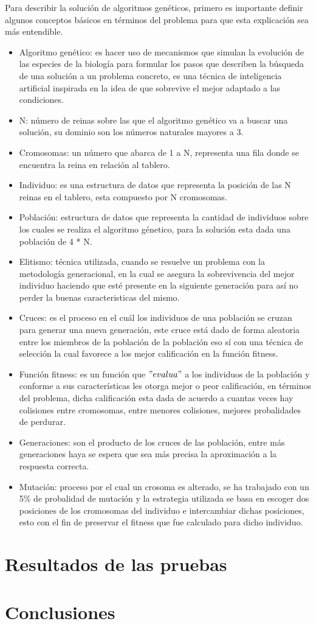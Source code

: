 \documentclass[12pt,a4paper]{article}
\begin{document}
\begin{enumerate}
Para describir la solución de algoritmos genéticos, primero es importante definir algunos conceptos básicos en términos del problema para que esta explicación sea más entendible. 
\begin{itemize}
\item Algoritmo genético: es hacer uso de mecanismos que simulan la evolución de las especies de la biología para formular los pasos que describen la búsqueda de una solución a un problema concreto, es una técnica de inteligencia artificial inspirada en la idea de que sobrevive el mejor adaptado a las condiciones.
\item N: número de reinas sobre las que el algoritmo genético va a buscar una solución, su dominio son los números naturales mayores a 3.
\item Cromosomas: un número que abarca de 1 a N, representa una fila donde se encuentra la reina en relación al tablero.
\item Individuo: es una estructura de datos que representa la posición de las N reinas en el tablero, esta compuesto por N cromosomas.
\item Población: estructura de datos que representa la cantidad de individuos sobre los cuales se realiza el algoritmo génetico, para la solución esta dada una población de 4 * N.
\item Elitismo: técnica utilizada, cuando se resuelve un problema con la metodología generacional, en la cual se asegura la sobrevivencia del mejor individuo haciendo que esté presente en la siguiente generación para así no perder la buenas caracteristicas del mismo. 
\item Cruces: es el proceso en el cuál los individuos de una población se cruzan para generar una nueva generación, este cruce está dado de forma aleatoria entre los miembros de la población de la población eso sí con una técnica de selección la cual favorece a los mejor calificación en la función fitness.
\item Función fitness: es un función que $"evalua"$ a los individuos de la población y conforme a sus características les otorga mejor o peor calificación, en términos del problema, dicha calificación esta dada de acuerdo a cuantas veces hay colisiones entre cromosomas, entre menores colisiones, mejores probalidades de perdurar. 
\item Generaciones: son el producto de los cruces de las población, entre más generaciones haya se espera que sea más precisa la aproximación a la respuesta correcta.
\item Mutación: proceso por el cual un crosoma es alterado, se ha trabajado con un 5\% de probalidad de mutación y la estrategia utilizada se basa en escoger dos posiciones de los cromosomas del individuo e intercambiar dichas posiciones, esto con el fin de preservar el fitness que fue calculado para dicho individuo.
\end{itemize}
\end{enumerate}
\pagebreak
\section{Resultados de las pruebas}


\pagebreak
\section{Conclusiones}
\end{document}
